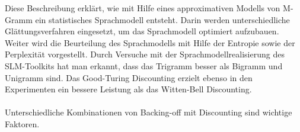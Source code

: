 Diese Beschreibung erkl\"art, wie mit Hilfe eines approximativen Modells von M-Gramm ein statistisches Sprachmodell entsteht. Darin werden unterschiedliche Gl\"attungsverfahren eingesetzt, um das Sprachmodell optimiert aufzubauen. Weiter wird die Beurteilung des Sprachmodells mit Hilfe der Entropie sowie der Perplexit\"at vorgestellt.
Durch Versuche mit der Sprachmodellrealisierung des SLM-Toolkits hat man erkannt, dass das Trigramm besser als Bigramm und Unigramm sind. Das Good-Turing Discounting erzielt ebenso in den Experimenten ein bessere Leistung als das Witten-Bell Discounting. 
\\
\\
Unterschiedliche Kombinationen von Backing-off mit Discounting sind wichtige Faktoren.

